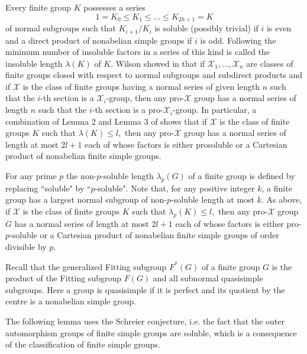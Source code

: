 \documentclass[12pt]{amsart}
\begin{document}
Every finite group $K$ possesses a series
\[1 = K_0 \le K_1 \le\dots \le K_{2h+1} = K\]
of normal subgroups such that $K_{i+1}/K_i$ is soluble (possibly trivial) if $i$ is
even and a direct product of nonabelian simple groups if $i$ is odd. Following \cite{KhSh15} the minimum number
of insoluble factors in a series of this kind is called the insoluble length $\lambda(K)$ of $K$.  Wilson showed in \cite{Wilson} that if $\mathcal{X}_1,\dots, \mathcal{X}_n$ are classes of finite groups closed with  respect to normal subgroups and subdirect products and 
if $\mathcal{X}$ is the class of finite groups having a normal series of given length $n$ such that
the $i$-th section is a $\mathcal{X}_i$-group, then any pro-$\mathcal{X}$ group has a normal series of length $n$  such that
the $i$-th section is a pro-$\mathcal{X}_i$-group. In particular, a combination of Lemma 2 and Lemma 3 of
\cite{Wilson} shows that if $\mathcal{X}$ is the class of finite groups $K$ such that $\lambda(K) \le l,$ then
any pro-$\mathcal{X}$ group has a normal series of  length at most $2l+1$ each of whose factors is
either prosoluble or a Cartesian product of nonabelian finite simple groups.

For any prime $p$ the non-$p$-soluble length $\lambda_p(G)$ of a finite group is defined by replacing ``soluble" by ``$p$-soluble". Note that, for any positive integer $k$, a finite group has a largest normal subgroup of non-$p$-soluble length at most $k$.
As above, if $\mathcal{X}$ is the class of finite groups $K$ such that $\lambda_p(K) \le l,$ then
any pro-$\mathcal{X}$ group $G$ has a normal series of  length at most $2l+1$ each of whose factors is
either pro-$p$-soluble or a Cartesian product of nonabelian finite simple groups of order divisible by $p$. 

Recall that the generalized Fitting subgroup $F^*(G)$ of a finite group
$G$ is the product of the Fitting subgroup $F(G)$ and all subnormal quasisimple subgroups. Here a group is quasisimple if it is perfect and its
quotient by the centre is a nonabelian simple group. 


 The following lemma 
 uses the Schreier conjecture, i.e. the fact that  the outer automorphism groups of finite simple groups are soluble, which is a consequence of the classification of finite simple groups.
\end{document}
